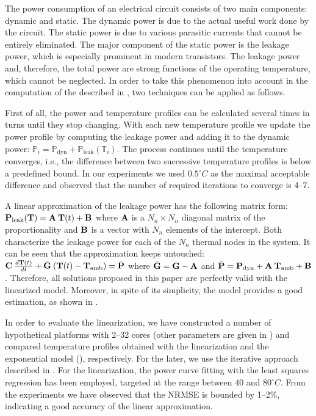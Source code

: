 The power consumption of an electrical circuit consists of two main components:
dynamic and static. The dynamic power is due to the actual useful work done by
the circuit. The static power is due to various parasitic currents that cannot
be entirely eliminated. The major component of the static power is the leakage
power, which is especially prominent in modern  transistors. The
leakage power and, therefore, the total power are strong functions of the
operating temperature, which cannot be neglected. In order to take this
phenomenon into account in the computation of the  described in
, two techniques can be applied as follows.

First of all, the power and temperature profiles can be calculated several times
in turns until they stop changing. With each new temperature profile we update
the power profile by computing the leakage power and adding it to the dynamic
power: $\mathbb{P}_i = \mathbb{P}_\text{dyn} +
\mathbb{P}_\text{leak}(\mathbb{T}_i)$. The process continues until the
temperature converges, i.e., the difference between two successive temperature
profiles is below a predefined bound. In our experiments we used $0.5^\circ C$
as the maximal acceptable difference and observed that the number of required
iterations to converge is 4--7.

A linear approximation of the leakage power has the following matrix form:
$\mathbf{P}_\text{leak}(\mathbf{T}) = \mathbf{A} \: \mathbf{T}(t) + \mathbf{B}$ where $\mathbf{A}$ is a $N_n
\times N_n$ diagonal matrix of the proportionality and $\mathbf{B}$ is a vector with
$N_n$ elements of the intercept. Both characterize the leakage power for each of
the $N_n$ thermal nodes in the system. It can be seen that the approximation
keeps  untouched: $\mathbf{C} \:
\frac{d\mathbf{T}(t)}{dt} + \bar{\mathbf{G}} \: (\mathbf{T}(t) - \mathbf{T}_{\mathrm{amb}}) = \bar{\mathbf{P}}$
where $\bar{\mathbf{G}} = \mathbf{G} - \mathbf{A}$ and $\bar{\mathbf{P}} = \mathbf{P}_\text{dyn} + \mathbf{A}
\: \mathbf{T}_{\mathrm{amb}} + \mathbf{B}$. Therefore, all solutions proposed in this paper are
perfectly valid with the linearized model. Moreover, in spite of its simplicity,
the model provides a good estimation, as shown in \cite{liu2007}.

In order to evaluate the linearization, we have constructed a number of
hypothetical platforms with 2--32 cores (other parameters are given in
) and compared temperature profiles obtained with the
linearization and the exponential model (), respectively. For
the later, we use the iterative approach described in
. For the linearization, the power curve
fitting with the least squares regression \cite{press2007} has been employed,
targeted at the range between 40 and $80^\circ C$. From the experiments we have
observed that the NRMSE is bounded by 1--2\%, indicating a good accuracy of the
linear approximation.
